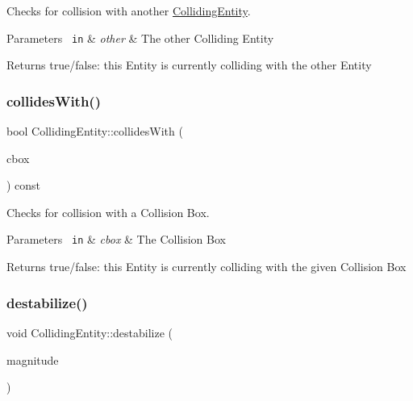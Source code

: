 Checks for collision with another \mbox{\hyperlink{class_colliding_entity}{Colliding\+Entity}}. 


\begin{DoxyParams}[1]{Parameters}
\mbox{\texttt{ in}}  & {\em other} & The other Colliding Entity\\
\hline
\end{DoxyParams}
\begin{DoxyReturn}{Returns}
true/false\+: this Entity is currently colliding with the other Entity 
\end{DoxyReturn}
\mbox{\label{class_colliding_entity_a36300f55f5bc4dfcb949929449b1151b}} 
\subsubsection{\texorpdfstring{collidesWith()}{collidesWith()}\hspace{0.1cm}{\footnotesize\ttfamily [2/2]}}
{\footnotesize\ttfamily bool Colliding\+Entity\+::collides\+With (\begin{DoxyParamCaption}\item[{const \mbox{\hyperlink{class_collision_box}{Collision\+Box}} \&}]{cbox }\end{DoxyParamCaption}) const\hspace{0.3cm}{\ttfamily [inline]}}



Checks for collision with a Collision Box. 


\begin{DoxyParams}[1]{Parameters}
\mbox{\texttt{ in}}  & {\em cbox} & The Collision Box\\
\hline
\end{DoxyParams}
\begin{DoxyReturn}{Returns}
true/false\+: this Entity is currently colliding with the given Collision Box 
\end{DoxyReturn}
\mbox{\label{class_colliding_entity_a15c9c43a0ffa68a7c1ed94bb0230e150}} 
\subsubsection{\texorpdfstring{destabilize()}{destabilize()}}
{\footnotesize\ttfamily void Colliding\+Entity\+::destabilize (\begin{DoxyParamCaption}\item[{float}]{magnitude }\end{DoxyParamCaption})\hspace{0.3cm}{\ttfamily [inline]}}




